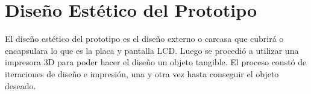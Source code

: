 \section{Diseño Estético del Prototipo}

\par 
El diseño estético del prototipo es el diseño externo o carcasa que cubrirá o encapsulara lo que es la placa y pantalla LCD. Luego se procedió a utilizar una impresora 3D para poder hacer el diseño un objeto tangible. El proceso constó de iteraciones de diseño e impresión, una y otra vez hasta conseguir el objeto deseado. 






